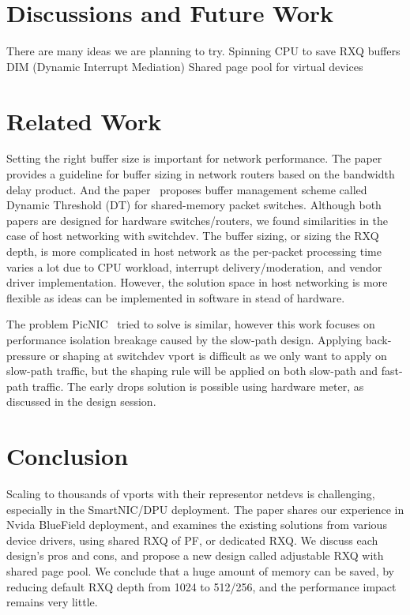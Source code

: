 \documentclass[letterpaper]{article}
\begin{document}
\section{Discussions and Future Work}
There are many ideas we are planning to try.
Spinning CPU to save RXQ buffers
DIM (Dynamic Interrupt Mediation) 
Shared page pool for virtual devices

\section{Related Work}
Setting the right buffer size is important for network performance.
The paper~\cite{buffersize} provides a guideline for buffer sizing
in network routers based on the bandwidth delay product.
And the paper~\cite{queuelength} proposes buffer management scheme
called Dynamic Threshold (DT) for shared-memory packet switches.
Although both papers are designed for hardware switches/routers,
we found similarities in the case of host networking with switchdev.
The buffer sizing, or sizing the RXQ depth, is more complicated in host
network as the per-packet processing time varies a lot due to CPU workload,
interrupt delivery/moderation, and vendor driver implementation.
However, the solution space in host networking is more flexible as
ideas can be implemented in software in stead of hardware.

The problem PicNIC~\cite{picnic} tried to solve is similar, however this
work focuses on performance isolation breakage caused by the slow-path
design. Applying back-pressure or shaping at switchdev vport is difficult
as we only want to apply on slow-path traffic, but the shaping rule will
be applied on both slow-path and fast-path traffic. The early drops solution
is possible using hardware meter, as discussed in the design session.

\section{Conclusion}
Scaling to thousands of vports with their representor netdevs is challenging,
especially in the SmartNIC/DPU deployment. The paper shares our experience in
Nvida BlueField deployment, and examines the existing
solutions from various device drivers, using shared RXQ of PF, or dedicated
RXQ. We discuss each design's pros and cons, and propose a new design called
adjustable RXQ with shared page pool. We conclude that a huge amount of memory can be saved,
by reducing default RXQ depth from 1024 to 512/256, and the performance impact
remains very little.
\end{document}
